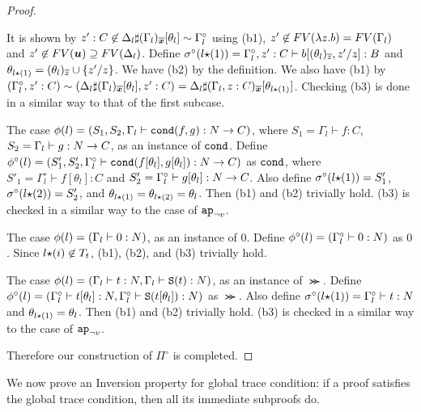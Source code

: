 \begin{proof}
\begin{itemize}
    It is shown by
    $z':C \not\in \Delta_l\sharp(\Gamma_l)_{\overline{\boldsymbol{x}}}[\theta_l] \sim \Gamma^\circ_l$
    using (b1), 
    $z'\not\in {{\relax FV}}(\lambda z.b) = {{\relax FV}}(\Gamma_l)$ and $z' \not\in\FV(\vec{u}) \supseteq \FV(\Delta_l)$. 
    Define $\sigma^\circ(l{\star}(1)) = \Gamma^\circ_l,z':C\vdash b[(\theta_l)_{\overline{z}},z'/z]:B$
    and $\theta_{l{\star}(1)} = (\theta_l)_{\overline{z}}\cup\{z'/z\}$.
    We have (b2) by the definition. 
    We also have (b1) by $(\Gamma^\circ_l,z':C) \sim (\Delta_l\sharp(\Gamma_l)_{\overline{\boldsymbol{x}}}[\theta_l],z':C) = \Delta_l\sharp(\Gamma_l,z:C)_{\overline{\boldsymbol{x}}}[\theta_{l{\star}(1)}]$.
    Checking (b3) is done in a similar way to that of the first subcase.
  \end{itemize}

  The case $\phi(l) = (S_1,S_2,\Gamma_l\vdash {\tt cond}(f,g):{N}\to C)$, where
  $S_1 = \Gamma_l\vdash f:C$, $S_2 = \Gamma_l\vdash g:{N}\to C$, as an instance of ${\tt cond}$. 
  Define $\phi^\circ(l) = (S'_1,S'_2,\Gamma^\circ_l\vdash {\tt cond}(f[\theta_l],g[\theta_l]):{N}\to C)$ as ${\tt cond}$,
  where $S'_1 = \Gamma^\circ_l \vdash f[\theta_l]:C$ and $S'_2 = \Gamma^\circ_l \vdash g[\theta_l]:{N}\to C$.
  Also define $\sigma^\circ(l{\star}(1)) = S'_1$, $\sigma^\circ(l{\star}(2))  = S'_2$,
  and $\theta_{l{\star}(1)} = \theta_{l{\star}(2)} = \theta_l$. 
  Then (b1) and (b2) trivially hold.
  (b3) is checked in a similar way to the case of $\apnotvar$.

  The case $\phi(l) = (\Gamma_l\vdash 0:{N})$, as an instance of $0$. 
  Define $\phi^\circ(l) = (\Gamma^\circ_l\vdash 0:{N})$ as $0$. 
  Since $l{\star}(i)\not\in T_t$, (b1), (b2), and (b3) trivially hold.
  
  The case $\phi(l) = (\Gamma_l\vdash t:{N}, \Gamma_l\vdash {\tt S}(t):{N})$, as an instance of $\Succ$. 
  Define
  $\phi^\circ(l) = (\Gamma^\circ_l\vdash t[\theta_l]:{N}, \Gamma^\circ_l\vdash {\tt S}(t[\theta_l]):{N})$ as $\Succ$. 
  Also define $\sigma^\circ(l{\star}(1)) = \Gamma^\circ_l\vdash t:{N}$
  and $\theta_{l{\star}(1)} = \theta_l$.
  Then (b1) and (b2) trivially hold.
  (b3) is checked in a similar way to the case of $\apnotvar$.

  Therefore our construction of $\Pi^\circ$ is completed.
\end{proof}

We now prove an Inversion property for global trace condition: if a proof satisfies the global trace condition, 
then all its immediate subproofs do.


